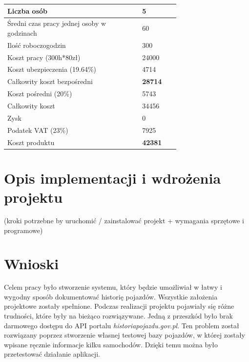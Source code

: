 \documentclass[12pt]{article}
\begin{document}
\begin{table}[H]
\begin{center}
\label{kosztorys}
	\begin{tabular}{|p{0.55\linewidth}|p{0.15\linewidth}|}%
	\hline
	Liczba osób 	& 5 				\\ \hline
	Średni czas pracy jednej osoby w godzinach		& 60\\ \hline
	Ilość roboczogodzin & 300	\\ \hline
	Koszt pracy (300h*80zł) & 24000	\\ \hline
	Koszt ubezpieczenia (19.64\%) & 4714	\\ \hline
	Całkowity koszt bezpośredni & \textbf{28714}	\\ \hline
	Koszt pośredni (20\%) & 5743\\ \hline
	Całkowity koszt & 34456\\ \hline
	Zysk & 0\\ \hline
	Podatek VAT (23\%) & 7925\\ \hline
	Koszt produktu & \textbf{42381}\\ \hline
	\end{tabular}
\end{center}
\end{table}


\newpage
\section{Opis implementacji i wdrożenia projektu}
(kroki potrzebne by uruchomić / zainstalować projekt + wymagania sprzętowe i programowe)


\newpage
\section{Wnioski}

Celem pracy było stworzenie systemu, który będzie umożliwiał w łatwy i wygodny sposób dokumentować historię pojazdów. Wszystkie założenia projektowe zostały spełnione. Podczas realizacji projektu pojawiały się różne trudności, które były na bieżąco rozwiązywane. Jedną z przeszkód było brak darmowego dostępu do API portalu \textit{historiapojazdu.gov.pl}. Ten problem został rozwiązany poprzez stworzenie własnej testowej bazy pojazdów, w której zostały wpisane ręcznie informacje kilku samochodów. Dzięki temu można było przetestować działanie aplikacji.
\end{document}

